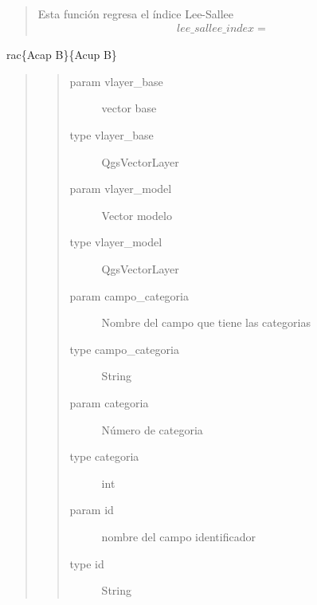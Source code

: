 \documentclass[letterpaper,10pt,spanish]{sphinxmanual}
\begin{document}
\noindent{}
\label{\detokenize{leesallee:module-indice_lee_sallee}}

\begin{fulllineitems}
\label{\detokenize{leesallee:indice_lee_sallee.indice_lee_salee}}~\begin{quote}

Esta función regresa el índice Lee-Sallee
\begin{equation*}
\begin{split}lee\_sallee\_index =  \end{split}
\end{equation*}\end{quote}

rac\{Acap B\}\{Acup B\}
\begin{quote}
\begin{quote}\begin{description}
\item[{param vlayer\_base}] \leavevmode
vector base

\item[{type vlayer\_base}] \leavevmode
QgsVectorLayer

\item[{param vlayer\_model}] \leavevmode
Vector modelo

\item[{type vlayer\_model}] \leavevmode
QgsVectorLayer

\item[{param campo\_categoria}] \leavevmode
Nombre del campo que tiene las categorias

\item[{type campo\_categoria}] \leavevmode
String

\item[{param categoria}] \leavevmode
Número de categoria

\item[{type categoria}] \leavevmode
int

\item[{param id}] \leavevmode
nombre del campo identificador

\item[{type id}] \leavevmode
String

\end{description}\end{quote}
\end{quote}

\end{fulllineitems}
\end{document}
